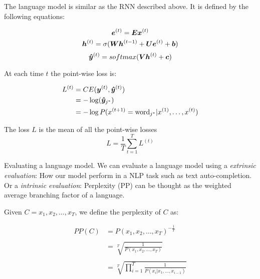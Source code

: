 The language model is similar as the RNN described above. It is defined by the following equations:

\begin{equation}
\bm{e}^{(t)} = \bm{E}\bm{x}^{(t)}
\end{equation}
\vspace{0.2cm}
 \begin{equation}
\bm{h}^{(t)} = \sigma(\bm{W}\bm{h}^{(t-1)}+ \bm{U}\bm{e}^{(t)}+ \bm{b})
\end{equation}
\vspace{0.2cm}
\begin{equation}
\bm{\hat{y}}^{(t)} = softmax(\bm{V}\bm{h}^{(t)} + \bm{c})
\end{equation}




At each time $t$ the point-wise loss is:

\vspace{0.2cm}

\begin{align}
L^{(t)} &= CE(\bm{y}^{(t)},\bm{\hat{y}}^{(t)})\\
    &= - \log(\bm{\hat{y}}_{j^{*}})\\
        &= - \log P(x^{(t+1)} = \text{word}_{j^{*}}|x^{(1)}, \dots, x^{(t)})
\end{align}

The loss $L$ is the mean of all the point-wise losses
\begin{equation}
L=\frac{1}{T}\sum_{t=1}^{T}L^{(t)}
\end{equation}


Evaluating a language model. We can evaluate a  language model using a \textit{extrinsic evaluation}: How our model perform in a NLP task such as text auto-completion. Or a \textit{intrinsic evaluation}: Perplexity (PP) can be thought as the weighted average branching factor of a language.


Given $C= x_1, x_2, \dots, x_T$, we define the perplexity of $C$ as:

\begin{align}
PP(C) &= P(x_1, x_2, \dots, x_T)^{-\frac{1}{T}}\\
    & \\
      &= \sqrt[T]{\frac{1}{P(x_1, x_2, \dots, x_T)}}\\
      & \\
      &= \sqrt[T]{\prod_{i=1}^{T}\frac{1}{P(x_i \vert x_1,\dots, x_{i-1})}}
\end{align}

